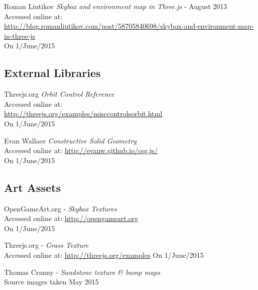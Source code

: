\begin{thebibliography}{99}
        Roman Liutikov
        \textit{Skybox and environment map in Three.js} - August 2013 \\
        Accessed online at: \\
        \href{http://blog.romanliutikov.com/post/58705840698/skybox-and-environment-map-in-three-js}{http://blog.romanliutikov.com/post/58705840698/skybox-and-environment-map-in-three-js}\\
        On 1/June/2015



\subsection{External Libraries}
        Threejs.org
        \textit{Orbit Control Reference} \\
        Accessed online at: \\
        \href{http://threejs.org/examples/misc_controls_orbit.html}{http://threejs.org/examples/misc{\textunderscore}controls{\textunderscore}orbit.html} \\
        On 1/June/2015

        Evan Wallace
        \textit{Constructive Solid Geometry}\\
        Accessed online at:
        \href{http://evanw.github.io/csg.js/}{http://evanw.github.io/csg.js/} \\
        On 1/June/2015




\subsection{Art Assets}
\label{ref:art_assets}

        OpenGameArt.org -
        \textit{Skybox Textures}\\
        Accessed online at:
        \href{http://opengameart.org}{http://opengameart.org}\\
        On 1/June/2015

        Threejs.org - \textit{Grass Texture}\\
        Accessed online at:
        \href{http://threejs.org/examples/textures}{http://threejs.org/examples}
        On 1/June/2015

        Thomas Cranny - \textit{Sandstone texture \& bump maps}\\
        Source images taken May 2015



\end{thebibliography}